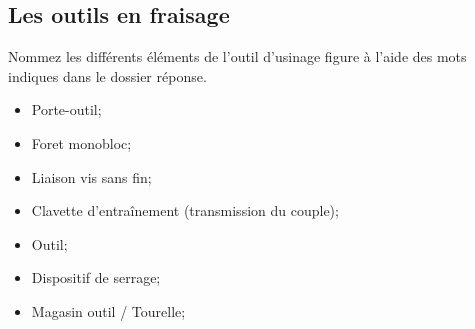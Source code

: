\documentclass[12pt,a4paper]{article} %
\begin{document}
\newpage

\subsection{Les outils en fraisage}

\begin{exo} Nommez les différents éléments de l’outil d’usinage figure à l'aide des mots
indiques dans le dossier réponse. \end{exo}

\begin{minipage}{.55\linewidth}
\begin{itemize}
    \item  {} Porte-outil;
    \item  {} Foret monobloc;
    \item  {} Liaison vis sans fin;
    \item  {} Clavette d'entraînement (transmission du couple);
\end{itemize} 
\end{minipage}
\begin{minipage}{.44\linewidth}
\begin{itemize}
    \item  {} Outil;
    \item  {} Dispositif de serrage;
    \item  {} Magasin outil / Tourelle;
\end{itemize} 
\end{minipage}
\end{document}
